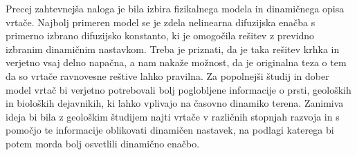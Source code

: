 \documentclass[a4paper, oneside, 12pt]{book}
\begin{document}
            Precej zahtevnejša naloga je bila izbira fizikalnega modela in dinamičnega opisa vrtače. Najbolj primeren model se je zdela nelinearna difuzijska enačba s primerno izbrano difuzijsko konstanto, ki je omogočila rešitev z previdno izbranim dinamičnim nastavkom. Treba je priznati, da je taka rešitev krhka in verjetno vsaj delno napačna, a nam nakaže možnost, da je originalna teza o tem da so vrtače ravnovesne reštive lahko pravilna.
            Za popolnejši študij in dober model vrtač bi verjetno potrebovali bolj poglobljene informacije o prsti, geoloških in bioloških dejavnikih, ki lahko vplivajo na časovno dinamiko terena. Zanimiva ideja bi bila z geološkim študijem najti vrtače v različnih stopnjah razvoja in s pomočjo te informacije oblikovati dinamičen nastavek, na podlagi katerega bi potem morda bolj osvetlili dinamično enačbo.

            \nocite{*}
            \newpage
            {}
            


            
\end{document}
